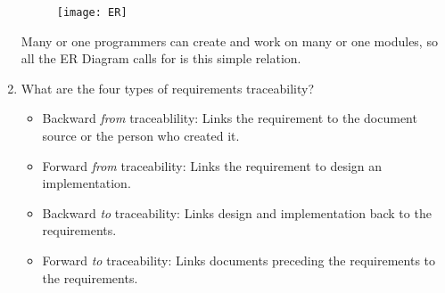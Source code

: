 \documentclass[11pt]{article}
\begin{document}
\begin{enumerate}
    \begin{figure}[H]
        \centering
        \texttt{[image: ER]}
    \end{figure}
    Many or one programmers can create and work on many or one modules, so all the ER Diagram calls for is this simple relation.
    
    
    \item What are the four types of requirements traceability?
    \begin{itemize}
        \item Backward \textit{from} traceablility: Links the requirement to the document source or the person who created it.
        \item Forward \textit{from} traceability: Links the requirement to design an implementation.
        \item Backward \textit{to} traceability: Links design and implementation back to the requirements.
        \item Forward \textit{to} traceability: Links documents preceding the requirements to the requirements.
    \end{itemize}
    
    \end{enumerate}
    
    
\end{document}
